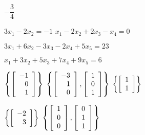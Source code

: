 
\begin{enumerate}[!HW!, start=1]
\begin{multicols}{3}
\itemspade $-\dfrac{3}{4}$

\itemspade$3x_1-2x_2=-1$ 
\itemspade $x_1-2x_2+2x_3-x_4=0$ 
\end{multicols}
\begin{multicols}{2}
\itemspade $3x_1+6x_2-3x_3-2x_4+5x_5=23$ 
\item $x_1+3x_2+5x_3+7x_4+9x_5=6$ %
\end{multicols}

\begin{multicols}{3}
\itemspade $\left\{\left[\begin{array}{r} -1\\0\\1 \end{array}\right]\right\}$
\itemspade $\left\{\left[\begin{array}{r} -3\\1\\0 \end{array}\right], \left[\begin{array}{r} 1\\0\\1 \end{array}\right]\right\}$
\itemspade $\left\{\left[\begin{array}{r} 1\\1 \end{array}\right]\right\}$
\end{multicols}
\begin{multicols}{2}
\itemspade $\left\{\left[\begin{array}{r} -2\\3 \end{array}\right]\right\}$
\itemspade $\left\{\left[\begin{array}{r} 1\\0\\0 \end{array}\right], \left[\begin{array}{r} 0\\1\\1 \end{array}\right]\right\}$
\end{multicols}
\end{enumerate}

\vspace{-15 pt}